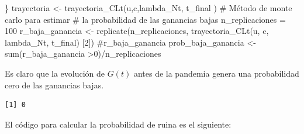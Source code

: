 \documentclass[
  us-letterpaper,
]{scrreprt}
\newenvironment{Shaded}{\begin{snugshade}}{\end{snugshade}}
\newcommand{\CommentTok}[1]{\textcolor[rgb]{0.37,0.37,0.37}{#1}}
\newcommand{\DecValTok}[1]{\textcolor[rgb]{0.68,0.00,0.00}{#1}}
\newcommand{\FunctionTok}[1]{\textcolor[rgb]{0.28,0.35,0.67}{#1}}
\newcommand{\NormalTok}[1]{\textcolor[rgb]{0.00,0.23,0.31}{#1}}
\newcommand{\OtherTok}[1]{\textcolor[rgb]{0.00,0.23,0.31}{#1}}
\newcommand{\SpecialCharTok}[1]{\textcolor[rgb]{0.37,0.37,0.37}{#1}}
\theoremstyle{plain}
\theoremstyle{plain}
\theoremstyle{definition}
\theoremstyle{remark}
\begin{document}
\begin{Shaded}
\begin{Highlighting}[]
\NormalTok{\}}
\NormalTok{trayectoria }\OtherTok{\textless{}{-}} \FunctionTok{trayectoria\_CLt}\NormalTok{(u,c,lambda\_Nt, t\_final )}
\CommentTok{\# Método de monte carlo para estimar }
\CommentTok{\# la probabilidad de las ganancias bajas}
\NormalTok{n\_replicaciones }\OtherTok{=} \DecValTok{100}
\NormalTok{r\_baja\_ganancia }\OtherTok{\textless{}{-}} \FunctionTok{replicate}\NormalTok{(n\_replicaciones,}
\FunctionTok{trayectoria\_CLt}\NormalTok{(u, c, lambda\_Nt, t\_final)}
\NormalTok{[}\DecValTok{2}\NormalTok{])}
\CommentTok{\#r\_baja\_ganancia }
\NormalTok{prob\_baja\_ganancia }\OtherTok{\textless{}{-}} \FunctionTok{sum}\NormalTok{(r\_baja\_ganancia }\SpecialCharTok{\textgreater{}}\DecValTok{0}\NormalTok{)}\SpecialCharTok{/}\NormalTok{n\_replicaciones}
\end{Highlighting}
\end{Shaded}

Es claro que la evolución de \(G(t)\) antes de la pandemia genera una
probabilidad cero de las ganancias bajas.

\begin{verbatim}
[1] 0
\end{verbatim}

El código para calcular la probabilidad de ruina es el siguiente:
\end{document}
